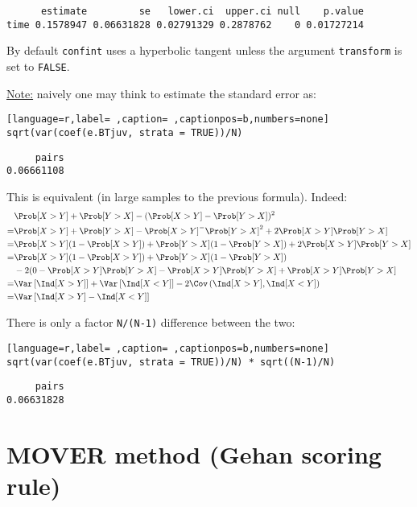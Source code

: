 \documentclass[12pt]{article}
\begin{document}
\begin{verbatim}
      estimate         se   lower.ci  upper.ci null    p.value
time 0.1578947 0.06631828 0.02791329 0.2878762    0 0.01727214
\end{verbatim}


By default \texttt{confint} uses a hyperbolic tangent unless the argument
\texttt{transform} is set to \texttt{FALSE}.

\bigskip

\uline{Note:} naively one may think to estimate the standard error as:
\begin{lstlisting}[language=r,label= ,caption= ,captionpos=b,numbers=none]
sqrt(var(coef(e.BTjuv, strata = TRUE))/N)
\end{lstlisting}

\begin{verbatim}
     pairs 
0.06661108
\end{verbatim}


This is equivalent (in large samples to the previous formula). Indeed:
\begin{align*}
&\Prob[X>Y] + \Prob[Y>X] - (\Prob[X>Y] - \Prob[Y>X])^2 \\
=& \Prob[X>Y] + \Prob[Y>X] - \Prob[X>Y]^ - \Prob[Y>X]^2 + 2 \Prob[X>Y] \Prob[Y>X] \\
=& \Prob[X>Y](1-\Prob[X>Y]) + \Prob[Y>X](1-\Prob[Y>X]) + 2 \Prob[X>Y] \Prob[Y>X] \\
=& \Prob[X>Y](1-\Prob[X>Y]) + \Prob[Y>X](1-\Prob[Y>X]) \\
 & - 2 (0 - \Prob[X>Y] \Prob[Y>X] - \Prob[X>Y] \Prob[Y>X] + \Prob[X>Y] \Prob[Y>X] \\
=& \Var\left[\Ind[X>Y]\right] + \Var\left[\Ind[X<Y]\right] - 2 \Cov\left(\Ind[X>Y],\Ind[X<Y]\right) \\
=& \Var\left[\Ind[X>Y]-\Ind[X<Y]\right] \\
\end{align*}

There is only a factor \texttt{N/(N-1)} difference between the two:
\begin{lstlisting}[language=r,label= ,caption= ,captionpos=b,numbers=none]
sqrt(var(coef(e.BTjuv, strata = TRUE))/N) * sqrt((N-1)/N)
\end{lstlisting}

\begin{verbatim}
     pairs 
0.06631828
\end{verbatim}


\clearpage

\section{MOVER method (Gehan scoring rule)}
\label{sec:org1938659}
\end{document}
